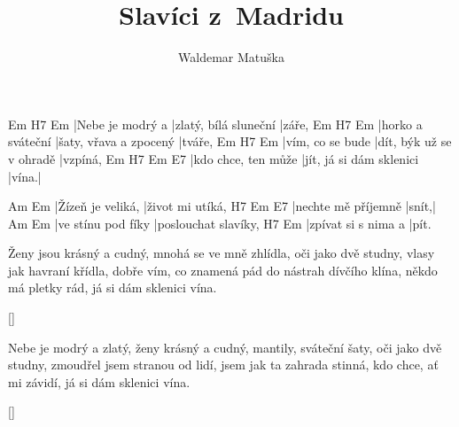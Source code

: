 \documentclass{song}
\title{Slavíci z~Madridu}
\author{Waldemar Matuška}
\begin{document}
\strophe
Em               H7                    Em
|Nebe je modrý a |zlatý, bílá sluneční |záře,
Em                H7                     Em
|horko a sváteční |šaty, vřava a zpocený |tváře,
Em               H7                       Em
|vím, co se bude |dít, býk už se v ohradě |vzpíná,
Em                  H7                       Em    E7
|kdo chce, ten může |jít, já si dám sklenici |vína.|
\endstrophe

Am                Em
|Žízeň je veliká, |život mi utíká,
H7                  Em    E7
|nechte mě příjemně |snít,|
Am                 Em
|ve stínu pod fíky |poslouchat slavíky,
H7                  Em
|zpívat si s nima a |pít.
\endstrophe

\strophe*
Ženy jsou krásný a cudný, mnohá se ve mně zhlídla,
oči jako dvě studny, vlasy jak havraní křídla,
dobře vím, co znamená pád do nástrah dívčího klína,
někdo má pletky rád, já si dám sklenici vína.
\endstrophe

\ref{}

\strophe*
Nebe je modrý a zlatý, ženy krásný a cudný,
mantily, sváteční šaty, oči jako dvě studny,
zmoudřel jsem stranou od lidí, jsem jak ta zahrada stinná,
kdo chce, ať mi závidí, já si dám sklenici vína.
\endstrophe

\ref{}
\end{document}

